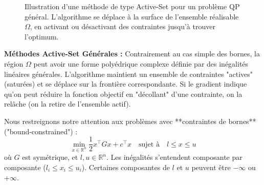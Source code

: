 \begin{figure}[H]
\centering
{}
\caption{Illustration d'une méthode de type Active-Set pour un problème QP général. L'algorithme se déplace à la surface de l'ensemble réalisable $\Omega$, en activant ou désactivant des contraintes jusqu'à trouver l'optimum.}
\label{fig:generic-active-set}
\end{figure}

\begin{figureexplanation}
\textbf{Méthodes Active-Set Générales :}
Contrairement au cas simple des bornes, la région $\Omega$ peut avoir une forme polyédrique complexe définie par des inégalités linéaires générales.
L'algorithme maintient un ensemble de contraintes "actives" (saturées) et se déplace sur la frontière correspondante. Si le gradient indique qu'on peut réduire la fonction objectif en "décollant" d'une contrainte, on la relâche (on la retire de l'ensemble actif).
\end{figureexplanation}

Nous restreignons notre attention aux problèmes avec **contraintes de bornes** ("bound-constrained") :
\begin{equation}
    \min_{x \in \mathbb{R}^n} \frac{1}{2} x^\top G x + c^\top x \quad \text{sujet à} \quad l \le x \le u
\end{equation}
où $G$ est symétrique, et $l, u \in \mathbb{R}^n$. Les inégalités s'entendent composante par composante ($l_i \le x_i \le u_i$). Certaines composantes de $l$ et $u$ peuvent être $-\infty$ ou $+\infty$.

